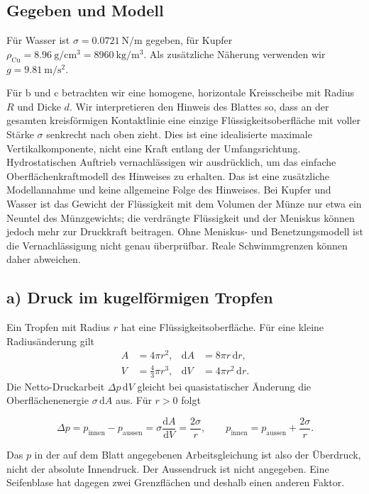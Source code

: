 \subsection*{Gegeben und Modell}
Für Wasser ist $\sigma=\qty{0.0721}{\newton\per\metre}$ gegeben, für
Kupfer $\rho_\mathrm{Cu}=\qty{8.96}{\gram\per\centi\metre\cubed}
=\qty{8960}{\kilogram\per\metre\cubed}$. Als zusätzliche Näherung
verwenden wir $g=\qty{9.81}{\metre\per\second\squared}$.

Für b und c betrachten wir eine homogene, horizontale Kreisscheibe mit
Radius $R$ und Dicke $d$. Wir interpretieren den Hinweis des Blattes so, dass
an der gesamten kreisförmigen Kontaktlinie eine einzige Flüssigkeitsoberfläche
mit voller Stärke $\sigma$ senkrecht nach oben zieht. Dies ist eine idealisierte
maximale Vertikalkomponente, nicht eine Kraft entlang der Umfangsrichtung.
Hydrostatischen Auftrieb vernachlässigen wir ausdrücklich, um das einfache
Oberflächenkraftmodell des Hinweises zu erhalten. Das ist eine zusätzliche
Modellannahme und keine allgemeine Folge des Hinweises. Bei Kupfer und Wasser
ist das Gewicht der Flüssigkeit mit dem Volumen der Münze nur etwa ein Neuntel
des Münzgewichts; die verdrängte Flüssigkeit und der Meniskus können jedoch
mehr zur Druckkraft beitragen. Ohne Meniskus- und Benetzungsmodell ist die
Vernachlässigung nicht genau überprüfbar. Reale Schwimmgrenzen können daher
abweichen.

\subsection*{a) Druck im kugelförmigen Tropfen}
Ein Tropfen mit Radius $r$ hat eine Flüssigkeitsoberfläche. Für eine kleine
Radiusänderung gilt
\begin{align}
  A&=4\pi r^2, & \mathrm dA&=8\pi r\,\mathrm dr,\\
  V&=\frac43\pi r^3, & \mathrm dV&=4\pi r^2\,\mathrm dr.
\end{align}
Die Netto-Druckarbeit $\Delta p\,\mathrm dV$ gleicht bei quasistatischer
Änderung die Oberflächenenergie $\sigma\,\mathrm dA$ aus. Für $r>0$ folgt
\begin{ergebnis}[a) Überdruck]
\begin{equation*}
  \Delta p=p_\mathrm{innen}-p_\mathrm{aussen}
  =\sigma\frac{\mathrm dA}{\mathrm dV}=\frac{2\sigma}{r},
  \qquad p_\mathrm{innen}=p_\mathrm{aussen}+\frac{2\sigma}{r}.
\end{equation*}
\end{ergebnis}
Das $p$ in der auf dem Blatt angegebenen Arbeitsgleichung ist also der
Überdruck, nicht der absolute Innendruck. Der Aussendruck ist nicht angegeben.
Eine Seifenblase hat dagegen zwei Grenzflächen und deshalb einen anderen Faktor.

